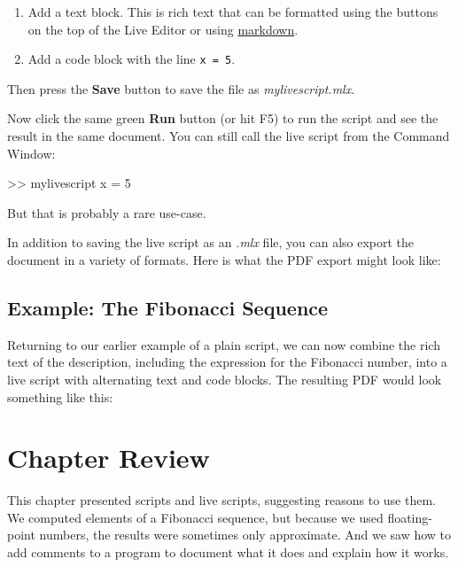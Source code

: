 \begin{enumerate}
\item Add a text block.  This is rich text that can be formatted using the buttons on the top of the Live Editor or using \href{https://www.mathworks.com/help/matlab/matlab_prog/format-live-scripts.html}{markdown}.
\item Add a code block with the line \lstinline{x = 5}.
\end{enumerate}

Then press the \textbf{Save} button to save the file as \emph{mylivescript.mlx}.

Now click the same green \textbf{Run} button (or hit F5) to run the script and see the result in the same document.  You can still call the live script from the Command Window:
\begin{code}
  >> mylivescript
  x =
       5
\end{code}
But that is probably a rare use-case.

In addition to saving the live script as an \emph{.mlx} file, you can also export the document in a variety of formats.  Here is what the PDF export might look like:




\subsection{Example: The Fibonacci Sequence}

Returning to our earlier example of a plain script, we can now combine the rich text of the description, including the expression for the Fibonacci number, into a live script with alternating text and code blocks.  The resulting PDF would look something like this: 


%

\section{Chapter Review}

This chapter presented scripts and live scripts, suggesting reasons to use them.  We computed elements of a Fibonacci sequence, but because we used floating-point numbers, the results were sometimes only approximate.
And we saw how to add comments to a program to document what it does and explain how it works.

